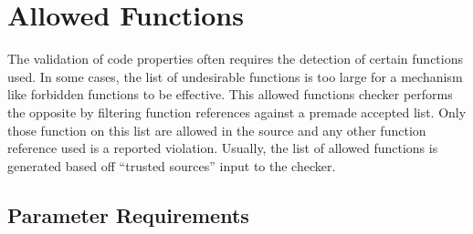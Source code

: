 %
%

\section{Allowed Functions}
\label{AllowedFunctions::overview}

The validation of code properties often requires the detection of certain
functions used. In some cases, the list of undesirable functions is too large
for a mechanism like forbidden functions to be effective. This allowed functions
checker performs the opposite by filtering function references against a
premade accepted list. Only those function on this list are allowed in the
source and any other function reference used is a reported violation. Usually,
the list of allowed functions is generated based off ``trusted sources'' input
to the checker.

\subsection{Parameter Requirements}

